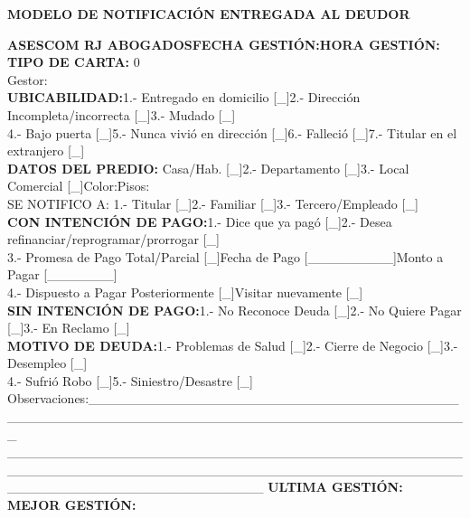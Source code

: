 \begin{center}
\textbf{ MODELO DE NOTIFICACIÓN ENTREGADA AL DEUDOR}
\end{center}
{\noindent
\textbf{ASESCOM RJ ABOGADOS}\hfill \textbf{FECHA GESTIÓN:}\hfill \textbf{HORA GESTIÓN:}\hfill \space\\         \textbf{TIPO DE CARTA:} {0}\\
Gestor:\\
\textbf{UBICABILIDAD:}\hfill 1.- Entregado en domicilio [\_]\hfill 2.- Dirección Incompleta/incorrecta [\_]\hfill 3.- Mudado [\_]\hfill \space\\
4.- Bajo puerta [\_]\hfill 5.- Nunca vivió en dirección [\_]\hfill 6.- Falleció [\_]\hfill 7.- Titular en el extranjero [\_]\hfill \space\\
\textbf{DATOS DEL PREDIO:} Casa/Hab. [\_]\hfill 2.- Departamento [\_]\hfill 3.- Local Comercial [\_]\hfill Color:\hfill Pisos:\hfill \space\\
SE NOTIFICO A: 1.- Titular [\_]\hfill 2.- Familiar [\_]\hfill 3.- Tercero/Empleado [\_]\hfill \space\\ 	
\textbf{CON INTENCIÓN DE PAGO:}\hfill 1.- Dice que ya pagó [\_]\hfill 2.- Desea refinanciar/reprogramar/prorrogar [\_]\hfill \space\\
3.- Promesa de Pago Total/Parcial [\_]\hfill Fecha de Pago [\_\_\_\_\_\_\_\_\_]\hfill Monto a Pagar [\_\_\_\_\_\_\_]\hfill \space\\
4.- Dispuesto a Pagar Posteriormente [\_]\hfill Visitar nuevamente [\_]\hfill \space\\
\textbf{SIN INTENCIÓN DE PAGO:}\hfill 1.- No Reconoce Deuda [\_]\hfill 2.- No Quiere Pagar [\_]\hfill 3.- En Reclamo [\_]\hfill \space\\
\textbf{MOTIVO DE DEUDA:}\hfill 1.- Problemas de Salud [\_]\hfill 2.- Cierre de Negocio [\_]\hfill 3.- Desempleo [\_]\hfill \space\\
4.- Sufrió Robo [\_]\hfill 5.- Siniestro/Desastre [\_]\hfill \space\\
Observaciones:\_\_\_\_\_\_\_\_\_\_\_\_\_\_\_\_\_\_\_\_\_\_\_\_\_\_\_\_\_\_\_\_\_\_\_\_\_\_\_\_\_\_\_\_\_\_\_\_\_\_\_\_\_\_\_\_\_\_\_\_\_\_\_\_\_\_\_\_\_\_\_\_\_\_\_\_\_\_\_\_\_\_\_\_\_\_\_\_\\
\_\_\_\_\_\_\_\_\_\_\_\_\_\_\_\_\_\_\_\_\_\_\_\_\_\_\_\_\_\_\_\_\_\_\_\_\_\_\_\_\_\_\_\_\_\_\_\_\_\_\_\_\_\_\_\_\_\_\_\_\_\_\_\_\_\_\_\_\_\_\_\_\_\_\_\_\_\_\_\_\_\_\_\_\_\_\_\_\_\_\_\_\_\_\_\_\_\_\_\_\_\_\_\_\_\_\_\_\_\_\_\_\_\_\_\_\_\_\_\_\_\_\_
\textbf{ULTIMA GESTIÓN:}\\
\textbf{MEJOR GESTIÓN:}
}










